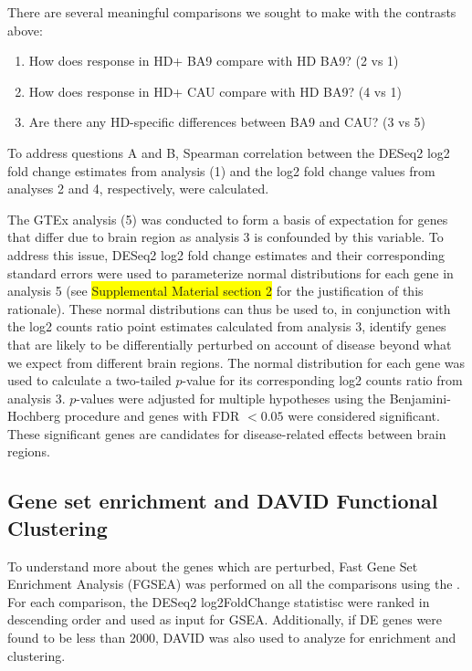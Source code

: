\documentclass[fleqn,10pt,table]{wlscirep}
\newcommand{\todo}[1]{\colorbox{yellow}{#1}}
\begin{document}
There are several meaningful comparisons we sought to make with the contrasts above:

\begin{enumerate}[label=\Alph*.]
\item How does response in HD+ BA9 compare with HD BA9? (2 vs 1)
\item How does response in HD+ CAU compare with HD BA9? (4 vs 1)
\item Are there any HD-specific differences between BA9 and CAU? (3 vs 5)
\end{enumerate}

To address questions A and B, Spearman correlation between the DESeq2 log2 fold change estimates from analysis (1) and the log2 fold change values from analyses 2 and 4, respectively, were calculated.

The GTEx analysis (5) was conducted to form a basis of expectation for genes that differ due to brain region as analysis 3 is confounded by this variable.
To address this issue, DESeq2 log2 fold change estimates and their corresponding standard errors were used to parameterize normal distributions for each gene in analysis 5 (see \todo{Supplemental Material section 2} for the justification of this rationale).
These normal distributions can thus be used to, in conjunction with the log2 counts ratio point estimates calculated from analysis 3, identify genes that are likely to be differentially perturbed on account of disease beyond what we expect from different brain regions.
The normal distribution for each gene was used to calculate a two-tailed $p$-value for its corresponding log2 counts ratio from analysis 3.
$p$-values were adjusted for multiple hypotheses using the Benjamini-Hochberg procedure \cite{Benjamini1995-ok} and genes with FDR $< 0.05$ were considered significant.
These significant genes are candidates for disease-related effects between brain regions.


\subsection{Gene set enrichment and DAVID Functional Clustering}

To understand more about the genes which are perturbed, Fast Gene Set Enrichment Analysis (FGSEA) was performed on all the comparisons using the .
For each comparison, the DESeq2 log2FoldChange statistisc were ranked in descending order and used as input for GSEA.
Additionally, if DE genes were found to be less than 2000, DAVID was also used to analyze for enrichment and clustering.
\end{document}
